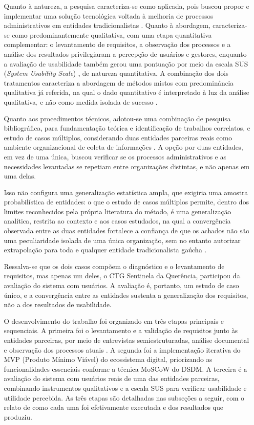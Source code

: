 \documentclass[12pt,a4paper]{article}
\begin{document}
Quanto à natureza, a pesquisa caracteriza-se como aplicada, pois buscou propor e implementar uma
solução tecnológica voltada à melhoria de processos administrativos em entidades tradicionalistas
\parencite{severino2016}. Quanto à abordagem, caracteriza-se como predominantemente qualitativa, com
uma etapa quantitativa complementar: o levantamento de requisitos, a observação dos processos e a
análise dos resultados privilegiaram a percepção de usuários e gestores, enquanto a avaliação de
usabilidade também gerou uma pontuação por meio da escala SUS (\textit{System Usability Scale})
\parencite{brooke1996}, de natureza quantitativa. A combinação dos dois tratamentos caracteriza a
abordagem de métodos mistos com predominância qualitativa já referida, na qual o dado quantitativo é
interpretado à luz da análise qualitativa, e não como medida isolada de sucesso
\parencite{gil2017,creswell2014}.

Quanto aos procedimentos técnicos, adotou-se uma combinação de pesquisa bibliográfica, para
fundamentação teórica e identificação de trabalhos correlatos, e estudo de casos múltiplos,
considerando duas entidades parceiras reais como ambiente organizacional de coleta de informações
\parencite{yin2015}. A opção por duas entidades, em vez de uma única, buscou verificar se os processos
administrativos e as necessidades levantadas se repetiam entre organizações distintas, e não apenas em
uma delas.

Isso não configura uma generalização estatística ampla, que exigiria uma amostra
probabilística de entidades: o que o estudo de casos múltiplos permite, dentro dos limites
reconhecidos pela própria literatura do método, é uma generalização analítica, restrita ao contexto e
aos casos estudados, na qual a convergência observada entre as duas entidades fortalece a confiança de
que os achados não são uma peculiaridade isolada de uma única organização, sem no entanto autorizar
extrapolação para toda e qualquer entidade tradicionalista gaúcha \parencite{yin2015}.

Ressalva-se que os dois casos compõem o diagnóstico e o levantamento de requisitos, mas apenas um deles, o CTG
Sentinela da Querência, participou da avaliação do sistema com usuários. A avaliação é, portanto, um
estudo de caso único, e a convergência entre as entidades sustenta a generalização dos requisitos, não
a dos resultados de usabilidade.

O desenvolvimento do trabalho foi organizado em três etapas principais e sequenciais. A primeira foi o
levantamento e a validação de requisitos junto às entidades parceiras, por meio de entrevistas
semiestruturadas, análise documental e observação dos processos atuais \parencite{lakatosMarconi2017}.
A segunda foi a implementação iterativa do MVP (Produto Mínimo Viável) do ecossistema digital,
priorizando as funcionalidades essenciais conforme a técnica MoSCoW do DSDM. A terceira é a avaliação
do sistema com usuários reais de uma das entidades parceiras, combinando instrumentos qualitativos e a escala
SUS para verificar usabilidade e utilidade percebida. As três etapas são detalhadas nas subseções a
seguir, com o relato de como cada uma foi efetivamente executada e dos resultados que produziu.
\end{document}
